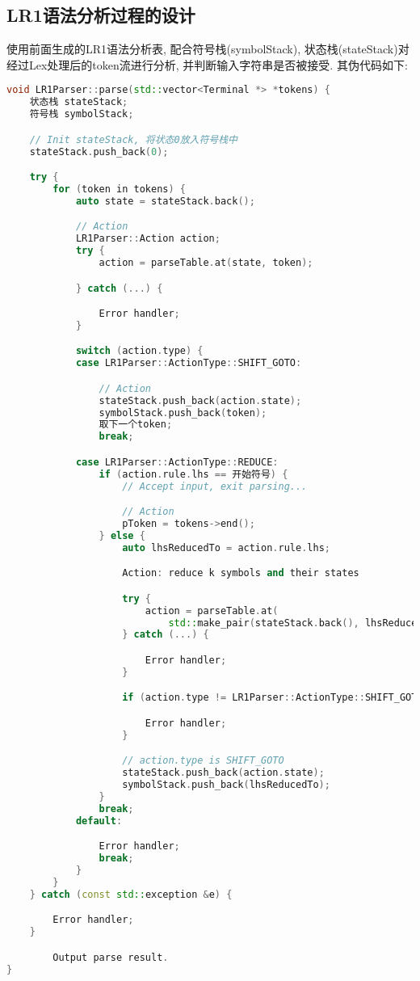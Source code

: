 \subsection{LR1语法分析过程的设计}
使用前面生成的LR1语法分析表, 配合符号栈(symbolStack),
状态栈(stateStack)对经过Lex处理后的token流进行分析, 并判断输入字符串是否被接受.
其伪代码如下:
\begin{lstlisting}[language=c++]
void LR1Parser::parse(std::vector<Terminal *> *tokens) {
    状态栈 stateStack;
    符号栈 symbolStack;

    // Init stateStack, 将状态0放入符号栈中
    stateStack.push_back(0);

    try {
        for (token in tokens) {
            auto state = stateStack.back();

            // Action
            LR1Parser::Action action;
            try {
                action = parseTable.at(state, token);

            } catch (...) {

                Error handler;
            }

            switch (action.type) {
            case LR1Parser::ActionType::SHIFT_GOTO:

                // Action
                stateStack.push_back(action.state);
                symbolStack.push_back(token);
                取下一个token;
                break;

            case LR1Parser::ActionType::REDUCE:
                if (action.rule.lhs == 开始符号) {
                    // Accept input, exit parsing...

                    // Action
                    pToken = tokens->end();
                } else {
                    auto lhsReducedTo = action.rule.lhs;

                    Action: reduce k symbols and their states

                    try {
                        action = parseTable.at(
                            std::make_pair(stateStack.back(), lhsReducedTo));
                    } catch (...) {

                        Error handler;
                    }

                    if (action.type != LR1Parser::ActionType::SHIFT_GOTO) {

                        Error handler;
                    }

                    // action.type is SHIFT_GOTO
                    stateStack.push_back(action.state);
                    symbolStack.push_back(lhsReducedTo);
                }
                break;
            default:

                Error handler;
                break;
            }
        }
    } catch (const std::exception &e) {

        Error handler;
    }

		Output parse result.
}
\end{lstlisting}

